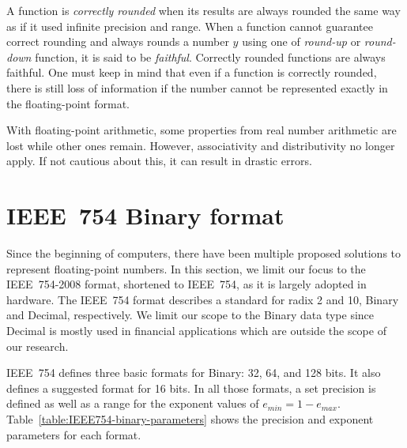 A function is \textit{correctly rounded} when its results are always rounded the 
same way as if it used infinite precision and range.
When a function cannot guarantee correct rounding and always rounds a number $y$
using one of \textit{round-up} or \textit{round-down} function, it is said to be \textit{faithful}.
Correctly rounded functions are always faithful.
One must keep in mind that even if a function is correctly rounded, there is
still loss of information if the number cannot be represented exactly in the
floating-point format.

With floating-point arithmetic, some properties from real number arithmetic are lost while other ones remain.
However, associativity and distributivity no longer apply.
If not cautious about this, it can result in drastic errors. 
	
						
\section{IEEE~754 Binary format}
\label{sc:ieee754}
Since the beginning of computers, there have been multiple proposed solutions to represent floating-point numbers.
In this section, we limit our focus to the IEEE~754-2008 format, shortened to IEEE~754, as it is largely adopted in hardware.
The IEEE~754 format describes a standard for radix 2 and 10, Binary and Decimal, respectively.
We limit our scope to the Binary data type since Decimal is mostly used in financial applications which are outside the scope of our research.
						
IEEE~754 defines three basic formats for Binary: 32, 64, and 128 bits.
It also defines a suggested format for 16 bits.
In all those formats, a set precision is defined as well as a range for the exponent values of $e_{min} = 1 - e_{max}$.
Table~\ref{table:IEEE754-binary-parameters} shows the precision and exponent parameters for each format. 
						
